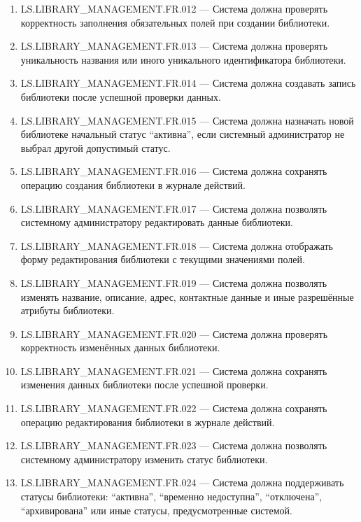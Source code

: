 \documentclass[12pt,a4paper]{article}
\begin{document}
\begin{enumerate}
		\item LS.LIBRARY\_MANAGEMENT.FR.012 --- Система должна проверять корректность
		заполнения обязательных полей при создании библиотеки.
		
		\item LS.LIBRARY\_MANAGEMENT.FR.013 --- Система должна проверять уникальность
		названия или иного уникального идентификатора библиотеки.
		
		\item LS.LIBRARY\_MANAGEMENT.FR.014 --- Система должна создавать запись библиотеки
		после успешной проверки данных.
		
		\item LS.LIBRARY\_MANAGEMENT.FR.015 --- Система должна назначать новой библиотеке
		начальный статус ``активна'', если системный администратор не выбрал другой
		допустимый статус.
		
		\item LS.LIBRARY\_MANAGEMENT.FR.016 --- Система должна сохранять операцию
		создания библиотеки в журнале действий.
		
		\item LS.LIBRARY\_MANAGEMENT.FR.017 --- Система должна позволять системному
		администратору редактировать данные библиотеки.
		
		\item LS.LIBRARY\_MANAGEMENT.FR.018 --- Система должна отображать форму
		редактирования библиотеки с текущими значениями полей.
		
		\item LS.LIBRARY\_MANAGEMENT.FR.019 --- Система должна позволять изменять
		название, описание, адрес, контактные данные и иные разрешённые атрибуты
		библиотеки.
		
		\item LS.LIBRARY\_MANAGEMENT.FR.020 --- Система должна проверять корректность
		изменённых данных библиотеки.
		
		\item LS.LIBRARY\_MANAGEMENT.FR.021 --- Система должна сохранять изменения
		данных библиотеки после успешной проверки.
		
		\item LS.LIBRARY\_MANAGEMENT.FR.022 --- Система должна сохранять операцию
		редактирования библиотеки в журнале действий.
		
		\item LS.LIBRARY\_MANAGEMENT.FR.023 --- Система должна позволять системному
		администратору изменить статус библиотеки.
		
		\item LS.LIBRARY\_MANAGEMENT.FR.024 --- Система должна поддерживать статусы
		библиотеки: ``активна'', ``временно недоступна'', ``отключена'', ``архивирована''
		или иные статусы, предусмотренные системой.
		

\end{enumerate}
\end{document}
